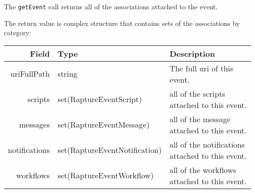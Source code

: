 The \verb+getEvent+ call returns all of the associations attached to the event.

The return value is complex structure that contains sets of the associations by category:

\begin{table}[h]
  \small
\begin{center}
\begin{tabular}{r l p{6cm}}
  Field & Type & Description \\
  \hline
  uriFullPath & string & The full uri of this event.\\
  scripts & set(RaptureEventScript) & all of the scripts attached to this event.\\
  messages & set(RaptureEventMessage) & all of the message attached to this event.\\
  notifications & set(RaptureEventNotification) & all of the notifications attached to this event.\\
  workflows & set(RaptureEventWorkflow) & all of the workflows attached to this event.\\
\end{tabular}
\end{center}
\end{table}
